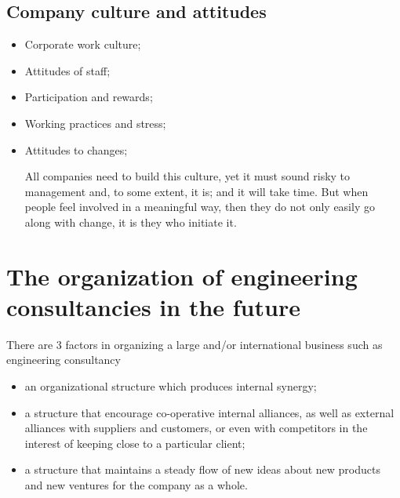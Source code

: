 \documentclass[a4paper,twoside,11pt]{article}
\begin{document}
\subsection{Company culture and attitudes}
\begin{itemize}
\item Corporate work culture;
\item Attitudes of staff;
\item Participation and rewards;
\item Working practices and stress;
\item Attitudes to changes;
\epigraph{All companies need to build this culture, yet it must sound risky to management and, to some extent, it is; and it will take time. But when people feel involved in a meaningful way, then they do not only easily go along with change, it is they who initiate it.}{}

\end{itemize}

\section{The organization of engineering consultancies in the future}


There are 3 factors in organizing a large and/or international business such as engineering consultancy
\begin{itemize}
\item an organizational structure which produces internal synergy;
\item a structure that encourage co-operative internal alliances, as well as external alliances with suppliers and customers, or even with competitors in the interest of keeping close to a particular client;
\item a structure that maintains a steady flow of new ideas about new products and new ventures for the company as a whole.
\end{itemize}
\end{document}
